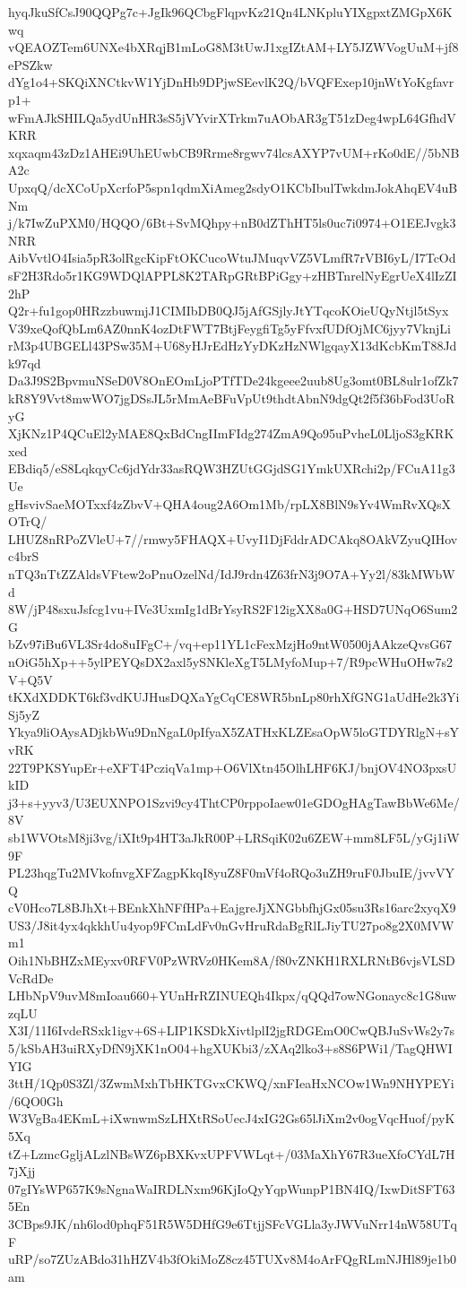 hyqJkuSfCsJ90QQPg7c+JgIk96QCbgFlqpvKz21Qn4LNKpluYIXgpxtZMGpX6Kwq
vQEAOZTem6UNXe4bXRqjB1mLoG8M3tUwJ1xgIZtAM+LY5JZWVogUuM+jf8ePSZkw
dYg1o4+SKQiXNCtkvW1YjDnHb9DPjwSEevlK2Q/bVQFExep10jnWtYoKgfavrp1+
wFmAJkSHILQa5ydUnHR3sS5jVYvirXTrkm7uAObAR3gT51zDeg4wpL64GfhdVKRR
xqxaqm43zDz1AHEi9UhEUwbCB9Rrme8rgwv74lcsAXYP7vUM+rKo0dE//5bNBA2c
UpxqQ/dcXCoUpXcrfoP5spn1qdmXiAmeg2sdyO1KCbIbulTwkdmJokAhqEV4uBNm
j/k7IwZuPXM0/HQQO/6Bt+SvMQhpy+nB0dZThHT5ls0uc7i0974+O1EEJvgk3NRR
AibVvtlO4Isia5pR3olRgcKipFtOKCucoWtuJMuqvVZ5VLmfR7rVBI6yL/I7TcOd
sF2H3Rdo5r1KG9WDQlAPPL8K2TARpGRtBPiGgy+zHBTnrelNyEgrUeX4lIzZI2hP
Q2r+fu1gop0HRzzbuwmjJ1CIMIbDB0QJ5jAfGSjlyJtYTqcoKOieUQyNtjl5tSyx
V39xeQofQbLm6AZ0nnK4ozDtFWT7BtjFeygfiTg5yFfvxfUDfOjMC6jyy7VknjLi
rM3p4UBGELl43PSw35M+U68yHJrEdHzYyDKzHzNWlgqayX13dKcbKmT88Jdk97qd
Da3J9S2BpvmuNSeD0V8OnEOmLjoPTfTDe24kgeee2uub8Ug3omt0BL8ulr1ofZk7
kR8Y9Vvt8mwWO7jgDSsJL5rMmAeBFuVpUt9thdtAbnN9dgQt2f5f36bFod3UoRyG
XjKNz1P4QCuEl2yMAE8QxBdCngIImFIdg274ZmA9Qo95uPvheL0LljoS3gKRKxed
EBdiq5/eS8LqkqyCc6jdYdr33asRQW3HZUtGGjdSG1YmkUXRchi2p/FCuA11g3Ue
gHsvivSaeMOTxxf4zZbvV+QHA4oug2A6Om1Mb/rpLX8BlN9sYv4WmRvXQsXOTrQ/
LHUZ8nRPoZVleU+7//rmwy5FHAQX+UvyI1DjFddrADCAkq8OAkVZyuQIHovc4brS
nTQ3nTtZZAldsVFtew2oPnuOzelNd/IdJ9rdn4Z63frN3j9O7A+Yy2l/83kMWbWd
8W/jP48sxuJsfcg1vu+IVe3UxmIg1dBrYsyRS2F12igXX8a0G+HSD7UNqO6Sum2G
bZv97iBu6VL3Sr4do8uIFgC+/vq+ep11YL1cFexMzjHo9ntW0500jAAkzeQvsG67
nOiG5hXp++5ylPEYQsDX2axl5ySNKleXgT5LMyfoMup+7/R9pcWHuOHw7s2V+Q5V
tKXdXDDKT6kf3vdKUJHusDQXaYgCqCE8WR5bnLp80rhXfGNG1aUdHe2k3YiSj5yZ
Ykya9liOAysADjkbWu9DnNgaL0pIfyaX5ZATHxKLZEsaOpW5loGTDYRlgN+sYvRK
22T9PKSYupEr+eXFT4PcziqVa1mp+O6VlXtn45OlhLHF6KJ/bnjOV4NO3pxsUkID
j3+s+yyv3/U3EUXNPO1Szvi9cy4ThtCP0rppoIaew01eGDOgHAgTawBbWe6Me/8V
sb1WVOtsM8ji3vg/iXIt9p4HT3aJkR00P+LRSqiK02u6ZEW+mm8LF5L/yGj1iW9F
PL23hqgTu2MVkofnvgXFZagpKkqI8yuZ8F0mVf4oRQo3uZH9ruF0JbuIE/jvvVYQ
cV0Hco7L8BJhXt+BEnkXhNFfHPa+EajgreJjXNGbbfhjGx05su3Rs16arc2xyqX9
US3/J8it4yx4qkkhUu4yop9FCmLdFv0nGvHruRdaBgRlLJiyTU27po8g2X0MVWm1
Oih1NbBHZxMEyxv0RFV0PzWRVz0HKem8A/f80vZNKH1RXLRNtB6vjsVLSDVcRdDe
LHbNpV9uvM8mIoau660+YUnHrRZINUEQh4Ikpx/qQQd7owNGonayc8c1G8uwzqLU
X3I/11I6IvdeRSxk1igv+6S+LIP1KSDkXivtlplI2jgRDGEmO0CwQBJuSvWs2y7s
5/kSbAH3uiRXyDfN9jXK1nO04+hgXUKbi3/zXAq2lko3+s8S6PWi1/TagQHWIYIG
3ttH/1Qp0S3Zl/3ZwmMxhTbHKTGvxCKWQ/xnFIeaHxNCOw1Wn9NHYPEYi/6QO0Gh
W3VgBa4EKmL+iXwnwmSzLHXtRSoUecJ4xIG2Gs65lJiXm2v0ogVqcHuof/pyK5Xq
tZ+LzmcGgljALzlNBsWZ6pBXKvxUPFVWLqt+/03MaXhY67R3ueXfoCYdL7H7jXjj
07gIYsWP657K9sNgnaWaIRDLNxm96KjIoQyYqpWunpP1BN4IQ/IxwDitSFT635En
3CBps9JK/nh6lod0phqF51R5W5DHfG9e6TtjjSFcVGLla3yJWVuNrr14nW58UTqF
uRP/so7ZUzABdo31hHZV4b3fOkiMoZ8cz45TUXv8M4oArFQgRLmNJHl89je1b0am
